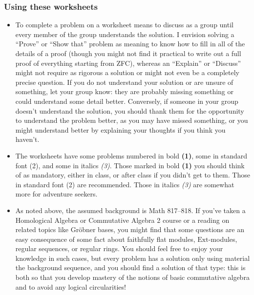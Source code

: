 \documentclass[12pt]{amsart}
\newcommand{\0}{$\phantom{.}$}
\newcommand{\1}{\mathbbm{1}}
\begin{document}
\subsubsection*{Using these worksheets} 
\begin{itemize}
\item To complete a problem on a worksheet means to discuss as a group until every member of the group understands the solution. I envision solving a ``Prove'' or ``Show that'' problem as meaning to know how to fill in all of the details of a proof (though you might not find it practical to write out a full proof of everything starting from ZFC), whereas an ``Explain'' or ``Discuss'' might not require as rigorous a solution or might not even be a completely precise question. If you do not understand your solution or are unsure of something, let your group know: they are probably missing something or could understand some detail better. Conversely, if someone in your group doesn't understand the solution, you should thank them for the opportunity to understand the problem better, as you may have missed something, or you might understand better by explaining your thoughts if you think you haven't.
\item The worksheets have some problems numbered in bold \textbf{(1)}, some in standard font (2), and some in italics \textit{(3)}. Those marked in bold \textbf{(1)} you should think of as mandatory, either in class, or after class if you didn't get to them. Those in standard font (2) are recommended. Those in italics \textit{(3)} are somewhat more for adventure seekers.
\item As noted above, the assumed background is Math 817--818. If you've taken a Homological Algebra or Commutative Algebra 2 course or a reading on related topics like Gr\"obner bases, you might find that some questions are an easy consequence of some fact about faithfully flat modules, $\mathrm{Ext}$-modules, regular sequences, or regular rings. You should feel free to enjoy your knowledge in such cases, but every problem has a solution only using material the background sequence, and you should find a solution of that type: this is both so that you develop mastery of the notions of basic commutative algebra and to avoid any logical circularities!
\end{itemize}
\end{document}
